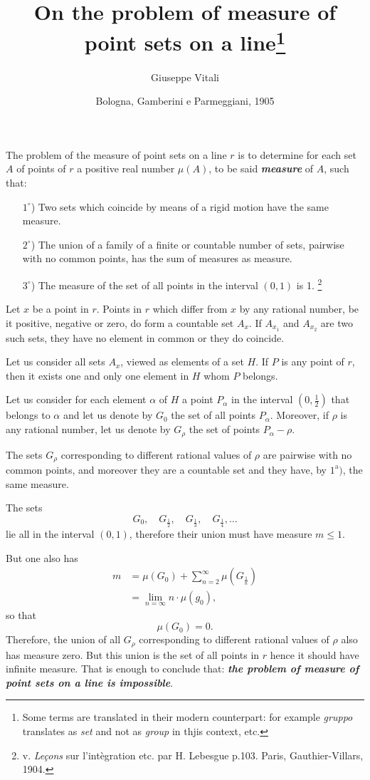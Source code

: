 \documentclass{article}
\title{On the problem of measure of point sets on a line\thanks{Some terms are translated in their modern counterpart: for example {\em gruppo} translates as {\em set} and not as {\em group} in thjis context, etc.}}
\author{Giuseppe Vitali}
\date{Bologna, Gamberini e Parmeggiani, 1905}
\begin{document}
\maketitle

The problem of the measure of point sets on a line $r$ is to determine for each set $A$ of points of $r$ a positive real number $\mu(A)$, to be said \emph{\bfseries measure} of $A$, such that:

\begin{itemize}
	\item[$1^\circ$)] Two sets which coincide by means of a rigid motion have the same measure.
	\item[$2^\circ$)] The union of a family of a finite or countable number of sets, pairwise with no common points, has the sum of measures as measure.
	\item[$3^\circ$)] The measure of the set of all points in the interval $(0,1)$ is 1. \footnote{ v. {\em Le\c cons} sur l'int\`egration etc. par H. Lebesgue p.103. Paris, Gauthier-Villars, 1904.}
\end{itemize}

Let $x$ be a point in $r$. Points in $r$ which differ from $x$ by any rational number, be it positive, negative or zero, do form a countable set $A_x$. If $A_{x_1}$ and $A_{x_2}$ are two such sets, they have no element in common or they do coincide.

Let us consider all sets $A_x$, viewed as elements of a set $H$. If $P$ is any point of $r$, then it exists one and only one element in $H$ whom $P$ belongs.

Let us consider for each element $\alpha$ of $H$ a point $P_\alpha$ in the interval $(0,\frac12)$ that belongs to $\alpha$ and let us denote by $G_0$ the set of all points $P_\alpha$. Moreover, if $\rho$ is any rational number, let us denote by $G_\rho$ the set of points $P_\alpha-\rho$.

The sets $G_\rho$ corresponding to different rational values of $\rho$ are pairwise with no common points, and moreover they are a countable set and they have, by $1^\textrm{a})$, the same measure.

The sets
\[
	G_0, \quad G_{\frac12}, \quad G_{\frac13}, \quad G_{\frac14}, \dots
\]
lie all in the interval $(0,1)$, therefore their union must have measure $m\leq1$.

But one also has
\begin{align*}
	m &= \mu(G_0) + \sum_{n=2}^\infty \mu\left(G_{\frac1n}\right) \\
		&= \lim_{n=\infty} n\cdot\mu(g_0),
\end{align*}
so that
\[
	\mu(G_0)=0.
\]
Therefore, the union of all $G_\rho$ corresponding to different rational values of $\rho$ also has measure zero. But this union is the set of all points in $r$ hence it should have infinite measure. That is enough to conclude that: \emph{\bfseries the problem of measure of point sets on a line is impossible}.
\end{document}
